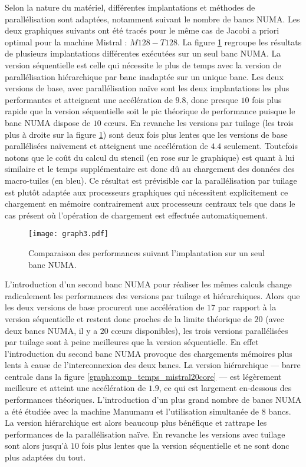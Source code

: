 Selon la nature du matériel, différentes implantations et méthodes de parallélisation sont adaptées, notamment suivant le nombre de bancs NUMA. Les deux graphiques suivants ont été tracés pour le même cas de Jacobi a priori optimal pour la machine \textsf{Mistral} : $M128-T128$. La figure \ref{graph:comp_temps_mistral10core} regroupe les résultats de plusieurs implantations différentes exécutées sur un seul banc NUMA. La version séquentielle est celle qui nécessite le plus de temps avec la version de parallélisation hiérarchique par banc inadaptée sur un unique banc. Les deux versions de base, avec parallélisation naïve sont les deux implantations les plus performantes et atteignent une accélération de $9.8$, donc presque $10$ fois plus rapide que la version séquentielle soit le pic théorique de performance puisque le banc NUMA dispose de $10$ cœurs. En revanche les versions par tuilage (les trois plus à droite sur la figure \ref{graph:comp_temps_mistral10core}) sont deux fois plus lentes que les versions de base parallélisées naïvement et atteignent une accélération de $4.4$ seulement. Toutefois notons que le coût du calcul du stencil (en rose sur le graphique) est quant à lui similaire et le temps supplémentaire est donc dû au chargement des données des macro-tuiles (en bleu). Ce résultat est prévisible car la parallélisation par tuilage est plutôt adaptée aux processeurs graphiques qui nécessitent explicitement ce chargement en mémoire contrairement aux processeurs centraux tels que dans le cas présent où l'opération de chargement est effectuée automatiquement.

\begin{figure}[!h]
  \caption{Comparaison des performances suivant l'implantation sur un seul banc NUMA.}
  \label{graph:comp_temps_mistral10core}
  \texttt{[image: graph3.pdf]}
\end{figure}

L'introduction d'un second banc NUMA pour réaliser les mêmes calculs change radicalement les performances des versions par tuilage et hiérarchiques. Alors que les deux versions de base procurent une accélération de $17$ par rapport à la version séquentielle et restent donc proches de la limite théorique de $20$ (avec deux bancs NUMA, il y a $20$ cœurs disponibles), les trois versions parallélisées par tuilage sont à peine meilleures que la version séquentielle. En effet l'introduction du second banc NUMA provoque des chargements mémoires plus lents à cause de l'interconnexion des deux bancs. La version hiérarchique --- barre centrale dans la figure \ref{graph:comp_temps_mistral20core} --- est légèrement meilleure et atteint une accélération de $1.9$, ce qui est largement en-dessous des performances théoriques. L'introduction d'un plus grand nombre de bancs NUMA a été étudiée avec la machine \textsf{Manumanu} et l'utilisation simultanée de $8$ bancs. La version hiérarchique est alors beaucoup plus bénéfique et rattrape les performances de la parallélisation naïve. En revanche les versions avec tuilage sont alors jusqu'à $10$ fois plus lentes que la version séquentielle et ne sont donc plus adaptées du tout.

